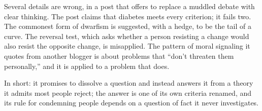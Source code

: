 \begin{afterword}
Several details are wrong, in a post that offers to replace a muddled debate with clear thinking. The post claims that diabetes meets every criterion; it fails two. The commonest form of dwarfism is suggested, with a hedge, to be the tail of a curve. The reversal test, which asks whether a person resisting a change would also resist the opposite change, is misapplied. The pattern of moral signaling it quotes from another blogger is about problems that ``don't threaten them personally,'' and it is applied to a problem that does.

In short: it promises to dissolve a question and instead answers it from a theory it admits most people reject; the answer is one of its own criteria renamed, and its rule for condemning people depends on a question of fact it never investigates.
\end{afterword}
